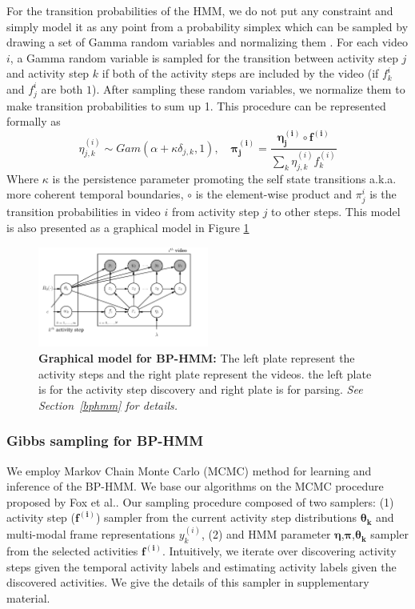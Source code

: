 For the transition probabilities of the HMM, we do not put any constraint and simply model it as any point from a probability simplex which can be sampled by drawing a set of Gamma random variables and normalizing them \cite{foxBPHMM}. For each video $i$, a Gamma random variable is sampled for the transition between activity step $j$ and activity step $k$ if both of the activity steps are included by the video (\ie if $f^i_k$ and $f^i_j$ are both $1$). After sampling these random variables, we normalize them to make transition probabilities to sum up 1. This procedure can be represented formally as
\begin{equation}
  \eta_{j,k}^{(i)} \sim Gam(\alpha+\kappa \delta_{j,k},1), \quad \mathbf{\pi_j^{(i)}} = \frac{\mathbf{\eta^{(i)}_j} \circ \mathbf{f^{(i)}}}{\sum_k \eta^{(i)}_{j,k} f^{(i)}_k}
\end{equation}
Where $\kappa$ is the persistence parameter promoting the self state transitions a.k.a. more coherent temporal boundaries, $\circ$ is the element-wise product and $\pi^i_j$ is the transition probabilities in video $i$ from activity step $j$ to other steps. This model is also presented as a graphical model in Figure \ref{bphmmo}
\begin{figure}[h!]
  \includegraphics[width=0.5\textwidth]{plate}
  \vspace{-9mm}
  \caption{\textbf{Graphical model for BP-HMM:} The left plate represent the activity steps and the right plate represent the videos. \ie the left plate is for the activity step discovery and right plate is for parsing. \emph{See Section~\ref{bphmm} for details.}}
  \vspace{-5mm}
  \label{bphmmo}
\end{figure}


\subsubsection{Gibbs sampling for BP-HMM}
We employ Markov Chain Monte Carlo (MCMC) method for learning and inference of the BP-HMM. We base our algorithms on the MCMC procedure proposed by Fox et al.\cite{foxBPHMM}. Our sampling procedure composed of two samplers: (1) activity step ($\mathbf{f^{(i)}}$) sampler from the current activity step distributions $\mathbf{\theta_k}$ and multi-modal frame representations $y^{(i)}_k$, (2) and HMM parameter $\mathbf{\eta}$,$\mathbf{\pi}$,$\mathbf{\theta_k}$ sampler from the selected activities $\mathbf{f^{(i)}}$. Intuitively, we iterate over discovering activity steps given the temporal activity labels and estimating activity labels given the discovered activities. We give the details of this sampler in supplementary material.
